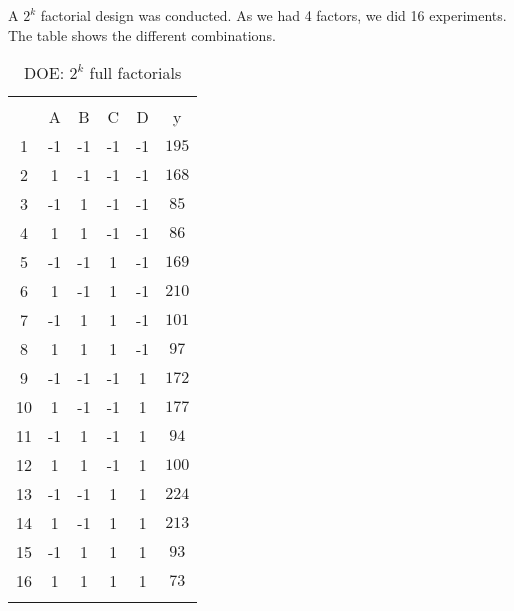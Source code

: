 A $2^k$ factorial design was conducted. As we had 4 factors, we did 16 experiments. The table shows the different combinations.

\begin{table}[H] \centering 
  \caption{DOE: $2^k$ full factorials} 
  \label{DOEtable} 
\begin{tabular}{@{\extracolsep{5pt}} cccccc} 
\\[-1.8ex]\hline 
\hline \\[-1.8ex] 
 & A & B & C & D & y \\ 
1 & -1 & -1 & -1 & -1 & $195$ \\ 
2 & 1 & -1 & -1 & -1 & $168$ \\ 
3 & -1 & 1 & -1 & -1 & $85$ \\ 
4 & 1 & 1 & -1 & -1 & $86$ \\ 
5 & -1 & -1 & 1 & -1 & $169$ \\ 
6 & 1 & -1 & 1 & -1 & $210$ \\ 
7 & -1 & 1 & 1 & -1 & $101$ \\ 
8 & 1 & 1 & 1 & -1 & $97$ \\ 
9 & -1 & -1 & -1 & 1 & $172$ \\ 
10 & 1 & -1 & -1 & 1 & $177$ \\ 
11 & -1 & 1 & -1 & 1 & $94$ \\ 
12 & 1 & 1 & -1 & 1 & $100$ \\ 
13 & -1 & -1 & 1 & 1 & $224$ \\ 
14 & 1 & -1 & 1 & 1 & $213$ \\ 
15 & -1 & 1 & 1 & 1 & $93$ \\
16 & 1 & 1 & 1 & 1 & $73$ \\
\hline \\[-1.8ex] 
\end{tabular} 
\end{table} 